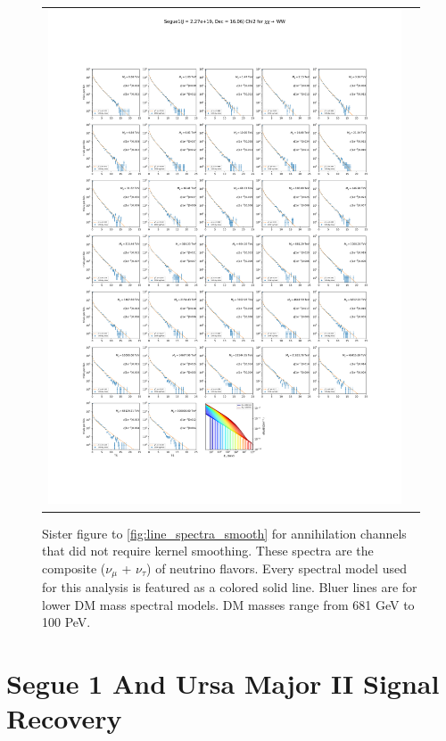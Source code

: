 \begin{figure}[ht]
{\begin{tabular}{cc}
            \includegraphics[clip, trim=22.1cm 6.5cm 19.5cm 56.5cm, scale=0.6]{figures/ic_DM/dm_plots/Segue1_WW_chi2_Masspanel_2024-04-28.pdf} \\
        \end{tabular}
    }\caption{Sister figure to \cref{fig:line_spectra_smooth} for annihilation channels that did not require kernel smoothing. These spectra are the composite ($\nu_\mu$ + $\nu_\tau$) of neutrino flavors. Every spectral model used for this analysis is featured as a colored solid line. Bluer lines are for lower DM mass spectral models. DM masses range from 681 GeV to 100 PeV.}
    \label{fig:compsoite_nu_spec}
\end{figure}

\clearpage

\chapter{Segue 1 And Ursa Major II Signal Recovery} \label{sec:apdx_TS_per_src}

